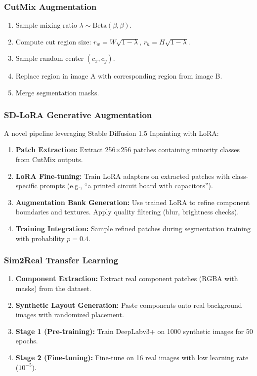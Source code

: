 \documentclass[12pt,a4paper]{article}
\begin{document}
\subsubsection{CutMix Augmentation}
\begin{enumerate}
    \item Sample mixing ratio $\lambda \sim \text{Beta}(\beta, \beta)$.
    \item Compute cut region size: $r_w = W\sqrt{1-\lambda}$, $r_h = H\sqrt{1-\lambda}$.
    \item Sample random center $(c_x, c_y)$.
    \item Replace region in image A with corresponding region from image B.
    \item Merge segmentation masks.
\end{enumerate}

\subsubsection{SD-LoRA Generative Augmentation}

A novel pipeline leveraging Stable Diffusion 1.5 Inpainting with LoRA:

\begin{enumerate}
    \item \textbf{Patch Extraction:} Extract 256$\times$256 patches containing minority classes from CutMix outputs.
    \item \textbf{LoRA Fine-tuning:} Train LoRA adapters on extracted patches with class-specific prompts (e.g., ``a printed circuit board with capacitors'').
    \item \textbf{Augmentation Bank Generation:} Use trained LoRA to refine component boundaries and textures. Apply quality filtering (blur, brightness checks).
    \item \textbf{Training Integration:} Sample refined patches during segmentation training with probability $p=0.4$.
\end{enumerate}

\subsubsection{Sim2Real Transfer Learning}

\begin{enumerate}
    \item \textbf{Component Extraction:} Extract real component patches (RGBA with masks) from the dataset.
    \item \textbf{Synthetic Layout Generation:} Paste components onto real background images with randomized placement.
    \item \textbf{Stage 1 (Pre-training):} Train DeepLabv3+ on 1000 synthetic images for 50 epochs.
    \item \textbf{Stage 2 (Fine-tuning):} Fine-tune on 16 real images with low learning rate ($10^{-5}$).
\end{enumerate}
\end{document}
